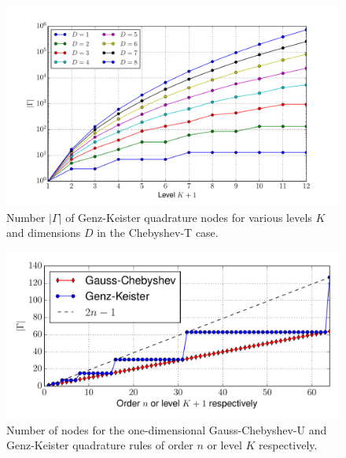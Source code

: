 \documentclass[a4paper,10pt]{article}
\begin{document}
\begin{figure}
  \centering
  \includegraphics[width=\linewidth]{./img/number_nodes_levdim_chebyshevt.pdf}
  \caption{Number $|\Gamma|$ of Genz-Keister quadrature nodes for various
  levels $K$ and dimensions $D$ in the Chebyshev-T case.}
  \label{fig:number_nodes_levdim_chebyshevt}
\end{figure}

\begin{figure}
  \centering
  \includegraphics[width=\linewidth]{./img/number_nodes_chebyshevu.pdf}
  \caption{Number of nodes for the one-dimensional Gauss-Chebyshev-U and Genz-Keister quadrature
  rules of order $n$ or level $K$ respectively.}
  \label{fig:number_nodes_chebyshevu}
\end{figure}
\end{document}
